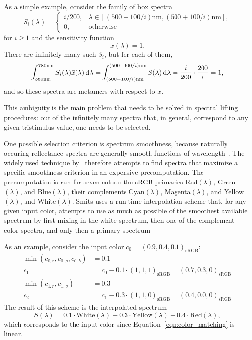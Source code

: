 As a simple example, consider the family of box spectra
\begin{equation*}
    S_i(\lambda) = \begin{cases}
        i / 200, &\lambda \in [ (500-100/i)\si{\nano\meter}, (500+100/i)\si{\nano\meter}],\\
        0, &\text{otherwise}
    \end{cases}
\end{equation*}
for $i \geq 1 $ and the sensitivity function
\begin{equation*}
    \bar x(\lambda) = 1.
\end{equation*}
There are infinitely many such $S_i$, but for each of them,
\begin{equation*}
    \int_{380\si{\nano\meter}}^{780\si{\nano\meter}} S_i(\lambda) \bar x(\lambda)\mathop{}\!\mathrm{d}\lambda
    = 
    \int_{(500-100/i)\si{\nano\meter}}^{(500+100/i)\si{\nano\meter}} S(\lambda)\mathop{}\!\mathrm{d}\lambda
    = \frac{i}{200} \cdot \frac{200}{i} = 1,
\end{equation*}
and so these spectra are metamers with respect to $\bar x$.

This ambiguity is the main problem that needs to be solved in spectral
lifting procedures: out of the infinitely many spectra that, in general,
correspond to any given tristimulus value, one needs to be selected.

One possible selection criterion is spectrum smoothness, because naturally occuring
reflectance spectra are generally smooth functions of wavelength~\citep{maloney86}. 
The widely
used technique by~\citet{smits99} therefore attempts to find spectra that
maximize a specific smoothness criterion in an expensive precomputation.
The precomputation is run for seven colors: the sRGB primaries 
Red$(\lambda)$, Green$(\lambda)$, and Blue$(\lambda)$, 
their complements
Cyan$(\lambda)$, Magenta$(\lambda)$, and Yellow$(\lambda)$, and White$(\lambda)$. 
Smits uses a run-time interpolation scheme
that, for any given input color, attempts to use as much as possible 
of the smoothest available spectrum by first mixing in the white spectrum, 
then one of the complement color spectra, and only then a primary spectrum.

As an example, consider the input color $c_0=(0.9, 0.4, 0.1)_\text{sRGB}$:
\begin{align*}
    \min(c_{0,r}, c_{0,g}, c_{0,b}) &= 0.1\\
    c_1 &= c_0 - 0.1\cdot(1,1,1)_\text{sRGB} = (0.7, 0.3, 0)_\text{sRGB}\\
    \min(c_{1,r}, c_{1,g}) &= 0.3\\
    c_2 &= c_1 - 0.3\cdot(1,1,0)_\text{sRGB} = (0.4, 0.0, 0)_\text{sRGB}
\end{align*}
The result of this scheme is the interpolated spectrum
\begin{equation}
    S(\lambda) = 0.1\cdot \text{White}(\lambda)
               + 0.3\cdot \text{Yellow}(\lambda)
               + 0.4\cdot \text{Red}(\lambda),
\end{equation}
which corresponds to the input color since Equation~\ref{eqn:color_matching} is linear.

